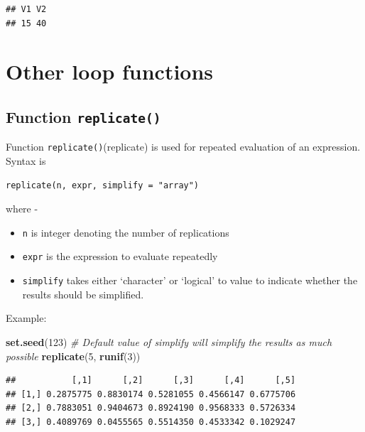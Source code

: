 \documentclass[
]{book}
\newenvironment{Shaded}{\begin{snugshade}}{\end{snugshade}}
\newcommand{\CommentTok}[1]{\textcolor[rgb]{0.56,0.35,0.01}{\textit{#1}}}
\newcommand{\DecValTok}[1]{\textcolor[rgb]{0.00,0.00,0.81}{#1}}
\newcommand{\FunctionTok}[1]{\textcolor[rgb]{0.13,0.29,0.53}{\textbf{#1}}}
\newcommand{\NormalTok}[1]{#1}
\providecommand{\tightlist}{%
  \setlength{\itemsep}{0pt}\setlength{\parskip}{0pt}}
\begin{document}
\begin{verbatim}
## V1 V2 
## 15 40
\end{verbatim}

\hypertarget{other-loop-functions}{%
\section{Other loop functions}\label{other-loop-functions}}

\hypertarget{function-replicate}{%
\subsection{\texorpdfstring{Function \texttt{replicate()}}{Function replicate()}}\label{function-replicate}}

Function \texttt{replicate()}\index(replicate) is used for repeated evaluation of an expression. Syntax is

\begin{verbatim}
replicate(n, expr, simplify = "array")
\end{verbatim}

where -

\begin{itemize}
\tightlist
\item
  \texttt{n} is integer denoting the number of replications
\item
  \texttt{expr} is the expression to evaluate repeatedly
\item
  \texttt{simplify} takes either `character' or `logical' to value to indicate whether the results should be simplified.
\end{itemize}

Example:

\begin{Shaded}
\begin{Highlighting}[]
\FunctionTok{set.seed}\NormalTok{(}\DecValTok{123}\NormalTok{)}
\CommentTok{\# Default value of simplify will simplify the results as much possible}
\FunctionTok{replicate}\NormalTok{(}\DecValTok{5}\NormalTok{, }\FunctionTok{runif}\NormalTok{(}\DecValTok{3}\NormalTok{))}
\end{Highlighting}
\end{Shaded}

\begin{verbatim}
##           [,1]      [,2]      [,3]      [,4]      [,5]
## [1,] 0.2875775 0.8830174 0.5281055 0.4566147 0.6775706
## [2,] 0.7883051 0.9404673 0.8924190 0.9568333 0.5726334
## [3,] 0.4089769 0.0455565 0.5514350 0.4533342 0.1029247
\end{verbatim}
\end{document}
